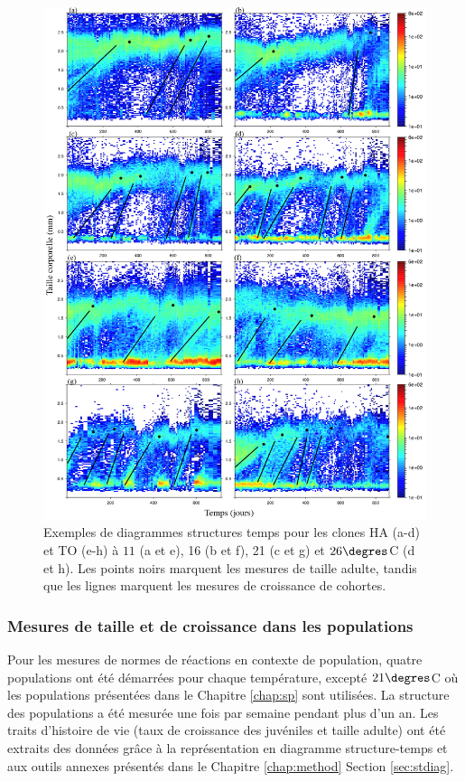 \begin{figure}[H]
\begin{center}
\includegraphics[width=\textwidth]{1_CorpsDeThese/Resumes/Fig/FIP02}
\caption[Exemples de diagrammes
structures temps]{Exemples de diagrammes
structures temps pour les clones HA
(a-d) et TO (e-h) à $11$ (a et e), 16 (b et f), 21 (c et g) et $26\degres$C
(d et h). Les points noirs marquent les mesures de taille
adulte, tandis que les lignes marquent les mesures de
croissance de cohortes.}
\label{fig:FIP2}
\end{center}
\end{figure}

\subsubsection{Mesures de taille et de croissance dans les populations}

Pour les mesures de normes de réactions en contexte de population, quatre
populations ont été démarrées pour chaque température, excepté $21\degres$C où
les populations présentées dans le Chapitre \ref{chap:sp} sont utilisées. La
structure des populations a été mesurée une fois par semaine pendant plus d'un
an. Les traits d'histoire de vie (taux de croissance des juvéniles et taille
adulte) ont été extraits des données grâce à la représentation en diagramme
structure-temps et aux outils annexes présentés dans le Chapitre
\ref{chap:method} Section \ref{sec:stdiag}. 

